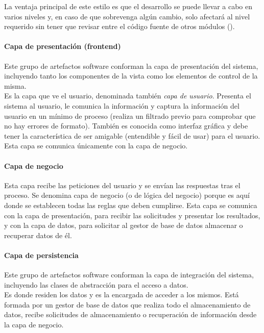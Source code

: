 La ventaja principal de este estilo es que el desarrollo se puede llevar a cabo en varios niveles y, en caso de que sobrevenga algún cambio, solo afectará al nivel requerido sin tener que revisar entre el código fuente de otros módulos (\cite{bib:wikipedia-programacion-por-capas}).

\paragraph*{Capa de presentación (frontend)}

Este grupo de artefactos software conforman la capa de presentación del sistema, incluyendo tanto los componentes de la vista como los elementos de control de la misma. \\

Es la capa que ve el usuario, denominada también \textit{capa de usuario}. Presenta el sistema al usuario, le comunica la información y captura la información del usuario en un mínimo de proceso (realiza un filtrado previo para comprobar que no hay errores de formato). También es conocida como interfaz gráfica y debe tener la característica de ser amigable (entendible y fácil de usar) para el usuario. Esta capa se comunica únicamente con la capa de negocio.

\paragraph*{Capa de negocio}

Esta capa recibe las peticiones del usuario y se envían las respuestas tras el proceso. Se denomina capa de negocio (o de lógica del negocio) porque es aquí donde se establecen todas las reglas que deben cumplirse. Esta capa se comunica con la capa de presentación, para recibir las solicitudes y presentar los resultados, y con la capa de datos, para solicitar al gestor de base de datos almacenar o recuperar datos de él. 

\paragraph*{Capa de persistencia}

Este grupo de artefactos software conforman la capa de integración del sistema, incluyendo las clases de abstracción para el acceso a datos.\\

Es donde residen los datos y es la encargada de acceder a los mismos. Está formada por un gestor de base de datos que realiza todo el almacenamiento de datos, recibe solicitudes de almacenamiento o recuperación de información desde la capa de negocio.\\

